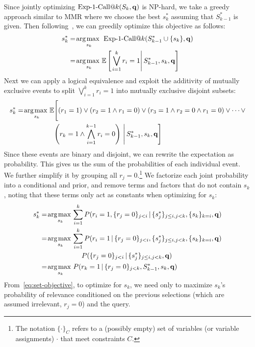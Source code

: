 Since jointly optimizing $\ExpOneCall(S_k,\vec{q})$ is NP-hard, we
take a greedy approach similar to MMR where we choose the best $s_k^*$
assuming that $S_{k-1}^*$ is given.  Then following~\cite{chen06Less},
we can greedily optimize this objective as 
follows:
\begin{align}
s_k^* & = \argmax_{s_k} \; \ExpOneCall(S_{k-1}^* \cup \{ s_k \},\vec{q}) \nonumber \\
   & = \argmax_{s_k} \mathbb{E}\left[\left. \bigvee_{i=1}^{k} r_i=1 \right| S_{k-1}^*, s_{k},\vec{q}\right] \nonumber
\end{align}
Next we can apply a logical equivalence and exploit the additivity of
mutually exclusive events to split $\bigvee_{i=1}^{k} r_i=1$ into mutually exclusive
disjoint subsets:
\begin{align}
s_k^* & = \argmax_{s_k} \mathbb{E}\Bigg[  (r_1=1) \vee (r_2 =1 \wedge r_1=0) \vee (r_3 =1 \wedge r_2=0 \wedge r_1=0) \vee \cdots \vee \nonumber \\
   & \hspace{19mm} \left(r_k=1 \wedge \bigwedge_{i=1}^{k-1} r_i=0 \right) \, \Bigg| \, S_{k-1}^*,s_k,\vec{q} \Bigg] \label{eq:logicalsplit}
\end{align}
Since these events are binary and disjoint, we can rewrite the expectation as probability.
This gives us the sum of the probabilities of each individual event.
We further simplify it by grouping all $r_j = 0$.\footnote{The notation 
$\{ \cdot \}_C$ refers to a (possibly empty) set of 
variables (or variable assignments) $\cdot$ that meet constraints $C$.}
We factorize each joint probability into a conditional and prior, and remove terms and factors that do not contain $s_k$, noting that these terms only act as constants when optimizing for $s_k$:
\begin{align}   
s_k^* & = \argmax_{s_k} \sum_{i=1}^{k} P(  r_i=1, \{ r_{j}=0 \}_{j<i} \, | \, \{ s^*_j \}_{j\leq i,j<k},\{ s_{k} \}_{k=i},\vec{q}) \nonumber \\
   &= \argmax_{s_k} \sum_{i=1}^{k} P(  r_i=1 \, | \, \{ r_{j}=0 \}_{j<i} , \{ s^*_j \}_{j\leq i,j<k},\{ s_k \}_{k=i},\vec{q}) \nonumber\\
   & \hspace{21.5mm} P(\{ r_{j}=0 \}_{j<i} \, | \, \{ s^*_j \}_{j\leq i,j<k}, \vec{q}) \nonumber \\
   &= \argmax_{s_k} P( r_k=1 \, | \, \{ r_{j}=0 \}_{j<k}, S_{k-1}^*,s_k,\vec{q}) \label{eq:set-objective}
\end{align}
From~\eqref{eq:set-objective}, to optimize for $s_k$, we need only to maximize $s_k$'s probability of relevance conditioned on the previous selections (which are assumed irrelevant, $r_j=0$) and the query.


